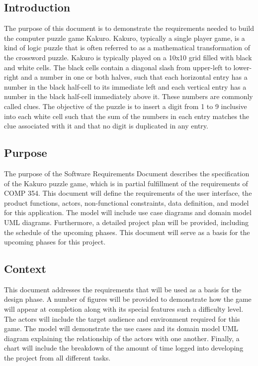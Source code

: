 \documentclass[12pt]{article}
\begin{document}
\subsection{Introduction}

\hspace{\parindent} The purpose of this document is to demonstrate the requirements needed to build the computer puzzle game Kakuro. Kakuro, typically a single player game, is a kind of logic puzzle that is often referred to as a mathematical transformation of the crossword puzzle. Kakuro is typically played on a 10x10 grid filled with black and white cells. The black cells contain a diagonal slash from upper-left to lower-right and a number in one or both halves, such that each horizontal entry has a number in the black half-cell to its immediate left and each vertical entry has a number in the black half-cell immediately above it. These numbers are commonly called clues. The objective of the puzzle is to insert a digit from 1 to 9 inclusive into each white cell such that the sum of the numbers in each entry matches the clue associated with it and that no digit is duplicated in any entry. 

\subsection{Purpose}

\hspace{\parindent} The purpose of the Software Requirements Document describes the specification of the Kakuro puzzle game, which is in partial fulfillment of the requirements of COMP 354. This document will define the requirements of the user interface, the product functions, actors, non-functional constraints, data definition, and model for this application. The model will include use case diagrams and domain model UML diagrams. Furthermore, a detailed project plan will be provided, including the schedule of the upcoming phases. This document will serve as a basis for the upcoming phases for this project. 

\subsection{Context}

\hspace{\parindent} This document addresses the requirements that will be used as a basis for the design phase. A number of figures will be provided to demonstrate how the game will appear at completion along with its special features such a difficulty level. The actors will include the target audience and environment required for this game. The model will demonstrate the use cases and its domain model UML diagram explaining the relationship of the actors with one another. Finally, a chart will include the breakdown of the amount of time logged into developing the project from all different tasks. 
\end{document}

